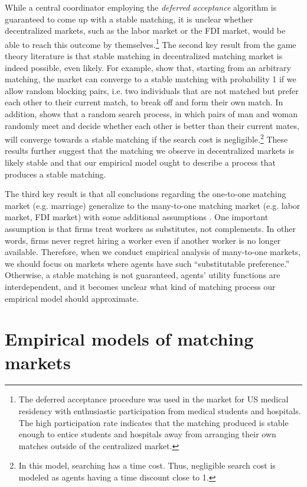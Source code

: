 While a central coordinator employing the \textit{deferred acceptance} algorithm
is guaranteed to come up with a stable matching, it is unclear whether
decentralized markets, such as the labor market or the FDI market, would be able
to reach this outcome by themselves.\footnote{The deferred acceptance procedure
  was used in the market for US medical residency with enthusiastic
  participation from medical students and hospitals. The high participation rate
  indicates that the matching produced is stable enough to entice students and
  hospitals away from arranging their own matches outside of the centralized
  market.} The second key result from the game theory literature is that stable
matching in decentralized matching market is indeed possible, even likely. For
example, \citet{Roth2016} show that, starting from an arbitrary matching, the
market can converge to a stable matching with probability 1 if we allow random
blocking pairs, i.e. two individuals that are not matched but prefer each other
to their current match, to break off and form their own match. In addition,
\citet{Adachi2003} shows that a random search process, in which pairs of man and
woman randomly meet and decide whether each other is better than their current
mates, will converge towards a stable matching if the search cost is
negligible.\footnote{In this model, searching has a time cost. Thus, negligible
  search cost is modeled as agents having a time discount close to 1.} These
results further suggest that the matching we observe in decentralized markets is
likely stable and that our empirical model ought to describe a
process that produces a stable matching.

The third key result is that all conclusions regarding the one-to-one matching
market (e.g. marriage) generalize to the many-to-one matching market (e.g. labor
market, FDI market) with some additional assumptions
\citep{Roth1992}. One important assumption is that firms treat workers as
substitutes, not complements. In other words, firms never regret hiring a worker
even if another worker is no longer available. Therefore, when we conduct
empirical analysis of many-to-one markets, we should focus on markets where
agents have such ``substitutable preference.'' Otherwise, a stable matching is
not guaranteed, agents' utility functions are interdependent, and it becomes
unclear what kind of matching process our empirical model should approximate.

\section{Empirical models of matching markets}

